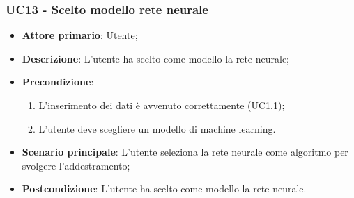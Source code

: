 \subsubsection{UC13 - Scelto modello rete neurale}
\label{sssec:uc13}
\begin{itemize}
  \item \textbf{Attore primario}: Utente;
  \item \textbf{Descrizione}: L'utente ha scelto come modello la rete neurale;
  \item \textbf{Precondizione}:
  \begin{enumerate}
    \item L'inserimento dei dati è avvenuto correttamente (UC1.1);
    \item L'utente deve scegliere un modello di machine learning.
  \end{enumerate}
  \item \textbf{Scenario principale}: L'utente seleziona la rete neurale come algoritmo per svolgere l'addestramento;
  \item \textbf{Postcondizione}: L'utente ha scelto come modello la rete neurale.
\end{itemize}

